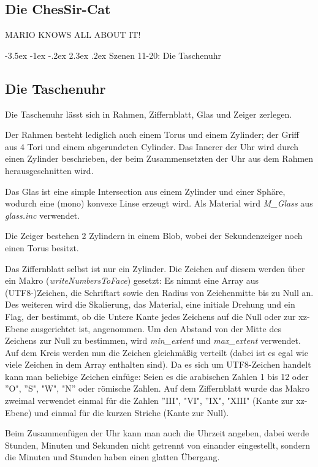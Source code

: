 \documentclass[twocolumn]{article}
\makeatletter
\renewcommand\section{\@startsection{section}{1}{\z@}%
                                      {-3.5ex \@plus -1ex \@minus -.2ex}%
                                      {2.3ex \@plus.2ex}%
                                      {\normalfont\large\bfseries}}
\makeatother
\begin{document}
\subsection{Die ChesSir-Cat}
MARIO KNOWS ALL ABOUT IT!

\section{Szenen 11-20: Die Taschenuhr}
\subsection{Die Taschenuhr}


Die Taschenuhr lässt sich in Rahmen, Ziffernblatt, Glas und Zeiger zerlegen.

Der Rahmen besteht lediglich auch einem Torus und einem Zylinder; der Griff aus 4 Tori und einem abgerundeten Cylinder.
Das Innerer der Uhr wird durch einen Zylinder beschrieben, der beim Zusammensetzten der Uhr aus dem Rahmen herausgeschnitten wird.

Das Glas ist eine simple Intersection aus einem Zylinder und einer Sphäre, wodurch eine (mono) konvexe Linse erzeugt wird.
Als Material wird  \textit{M\_Glass} aus \textit{glass.inc} verwendet.

Die Zeiger bestehen 2 Zylindern in einem Blob, wobei der Sekundenzeiger noch einen Torus besitzt.

Das Ziffernblatt selbst ist nur ein Zylinder. Die Zeichen auf diesem werden über ein Makro (\textit{writeNumbersToFace}) gesetzt:
Es nimmt eine Array aus (UTF8-)Zeichen, die Schriftart sowie den Radius von Zeichenmitte bis zu Null an. Des weiteren wird die Skalierung, das Material, eine initiale Drehung und ein Flag, der bestimmt, ob die Untere Kante jedes Zeichens auf die Null oder zur xz-Ebene ausgerichtet ist, angenommen. Um den Abstand von der Mitte des Zeichens zur Null zu bestimmen, wird \textit{min\_extent} und \textit{max\_extent} verwendet. Auf dem Kreis werden nun die Zeichen gleichmäßig verteilt (dabei ist es egal wie viele Zeichen in dem Array enthalten sind). Da es sich um UTF8-Zeichen handelt kann man beliebige Zeichen einfüge: Seien es die arabischen Zahlen 1 bis 12 oder  ''O", ''S", "W", "N'' oder römische Zahlen.
Auf dem Ziffernblatt wurde das Makro zweimal verwendet einmal für die Zahlen ''III", "VI", ''IX", "XIII" (Kante zur xz-Ebene) und einmal für die kurzen Striche (Kante zur Null).

Beim Zusammenfügen der Uhr kann man auch die Uhrzeit angeben, dabei werde Stunden, Minuten und Sekunden nicht getrennt von einander eingestellt, sondern die Minuten und Stunden haben einen glatten Übergang.
\end{document}
